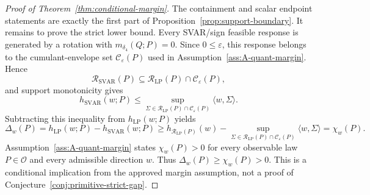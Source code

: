 \documentclass[11pt]{article}
\theoremstyle{definition}
\theoremstyle{plain}
\theoremstyle{remark}
\begin{document}
\begin{proof}[Proof of Theorem~\ref{thm:conditional-margin}]
The containment and scalar endpoint statements are exactly the first part of
Proposition~\ref{prop:support-boundary}.  It remains to prove the strict
lower bound.  Every SVAR/sign feasible response is generated by a rotation
with \(m_{\delta_4}(Q;P)=0\).  Since \(0\le\varepsilon\), this response belongs
to the cumulant-envelope set \(\mathcal C_\varepsilon(P)\) used in
Assumption~\ref{ass:A-quant-margin}.  Hence
\[
\mathcal R_{\mathrm{SVAR}}(P)
\subseteq
\mathcal R_{\mathrm{LP}}(P)\cap\mathcal C_\varepsilon(P),
\]
and support monotonicity gives
\[
h_{\mathrm{SVAR}}(w;P)
\le
\sup_{\Sigma\in\mathcal R_{\mathrm{LP}}(P)\cap\mathcal C_\varepsilon(P)}
\langle w,\Sigma\rangle.
\]
Subtracting this inequality from \(h_{\mathrm{LP}}(w;P)\) yields
\[
\Delta_w(P)
=h_{\mathrm{LP}}(w;P)-h_{\mathrm{SVAR}}(w;P)
\ge
h_{\mathcal R_{\mathrm{LP}}(P)}(w)
-
\sup_{\Sigma\in\mathcal R_{\mathrm{LP}}(P)\cap\mathcal C_\varepsilon(P)}
\langle w,\Sigma\rangle
=\chi_w(P).
\]
Assumption~\ref{ass:A-quant-margin} states \(\chi_w(P)>0\) for every
observable law \(P\in\mathcal O\) and every admissible direction \(w\).  Thus
\(\Delta_w(P)\ge\chi_w(P)>0\).  This is a conditional implication from the
approved margin assumption, not a proof of
Conjecture~\ref{conj:primitive-strict-gap}.
\end{proof}
\end{document}
